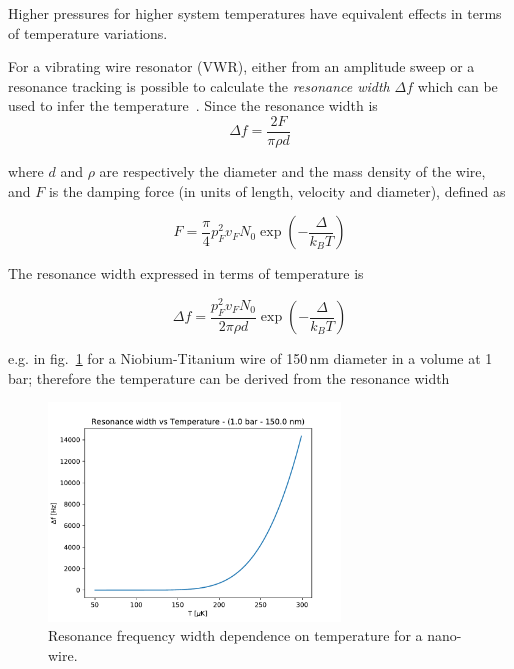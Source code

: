 \documentclass[a4paper,12pt]{article}
\begin{document}
Higher pressures for higher system temperatures have equivalent effects in terms of temperature variations.

For a vibrating wire resonator (VWR), either from an amplitude sweep or a resonance tracking is possible to calculate the \textit{resonance width} $\Delta f$ which can be used to infer the temperature~\cite{lawson}.
Since the resonance width is
\begin{equation}
\Delta f = \frac{2F}{\pi \rho d}
\end{equation}

where $d$ and $\rho$ are respectively the diameter and the mass density of the wire, and $F$ is the damping %
force (in units of length, velocity and diameter), defined as

\begin{equation}
F = \frac{\pi}{4}p^2_F v_F N_0 \exp{\left( -\frac{\varDelta}{k_B T} \right)}
\end{equation}

The resonance width expressed in terms of temperature is

\begin{equation}
\Delta f = \frac{p^2_F v_F N_0}{2\pi\rho d}\exp{\left( -\frac{\varDelta}{k_B T} \right)}
\end{equation}

e.g. in fig.~\ref{fig:WvsT} for a Niobium-Titanium wire of 150\,nm diameter in a volume at 1\,bar; therefore the temperature can be derived from the resonance width

\begin{figure}[!ht]
  \begin{center}
    \includegraphics[width=0.69\textwidth]{W_vs_T}
    \caption{Resonance frequency width dependence on temperature for a nano-wire.}
    \label{fig:WvsT}
  \end{center}
\end{figure}
\end{document}
